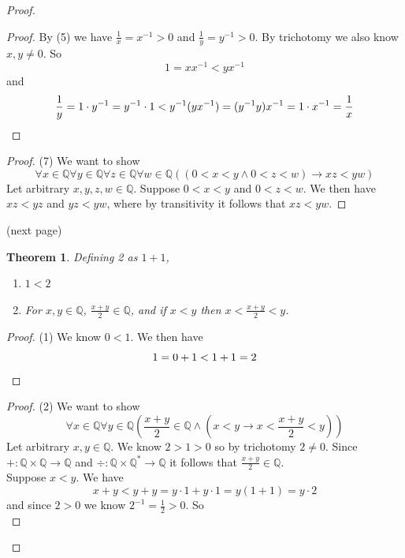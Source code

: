 \documentclass{report}
\newtheorem{theorem}[theo]{Theorem}
\begin{document}
\begin{proof}
\begin{proof}
By (5) we have $\frac{1}{x}=x^{-1}>0$ and $\frac{1}{y}=y^{-1}>0$. By trichotomy we also know $x,y\neq0$. So 
\begin{equation*}
1=xx^{-1}<yx^{-1}
\end{equation*}
and
\begin{equation*}
\frac{1}{y}=1\cdot y^{-1}=y^{-1}\cdot1<y^{-1}(yx^{-1})=(y^{-1}y)x^{-1}=1\cdot x^{-1}=\frac{1}{x}\qedhere
\end{equation*}
\end{proof}
\begin{proof}(7)
We want to show 
\begin{equation*}
\forall x\in\mathbb Q\forall y\in\mathbb Q\forall z\in\mathbb Q\forall w\in\mathbb Q((0<x<y\land0<z<w)\to xz<yw)
\end{equation*}
Let arbitrary $x,y,z,w\in\mathbb Q$. Suppose $0<x<y$ and $0<z<w$. We then have $xz<yz$ and $yz<yw$, where by transitivity it follows that 
$xz<yw$.
\end{proof}
\noindent(next page)\newpage
\begin{theorem}
Defining 2 as $1+1$, 
\begin{enumerate}
\item $1<2$
\item For $x,y\in\mathbb Q$, $\frac{x+y}{2}\in\mathbb Q$, and if $x<y$ then $x<\frac{x+y}{2}<y$.
\end{enumerate}
\end{theorem}
\begin{proof}(1)
We know $0<1$. We then have 
\begin{equation*}
1=0+1<1+1=2\qedhere
\end{equation*}
\end{proof}
\begin{proof}(2)
We want to show
\begin{equation*}
\forall x\in\mathbb Q\forall y\in\mathbb Q\left(\frac{x+y}{2}\in\mathbb Q\land\left(x<y\to x<\frac{x+y}{2}<y\right)\right)
\end{equation*}
Let arbitrary $x,y\in\mathbb Q$. We know $2>1>0$ so by trichotomy $2\neq0$. Since $+:\mathbb Q\times\mathbb Q\to\mathbb Q$ and $\div:\mathbb Q\times\mathbb Q^*\to\mathbb Q$ it follows that
$\frac{x+y}{2}\in\mathbb Q$.\\
\indent Suppose $x<y$. We have 
\begin{equation*}
x+y<y+y=y\cdot1+y\cdot1=y(1+1)=y\cdot2
\end{equation*}
and since $2>0$ we know $2^{-1}=\frac{1}{2}>0$. So 
\begin{equation*}

\end{equation*}
\end{proof}
\end{proof}
\end{document}
